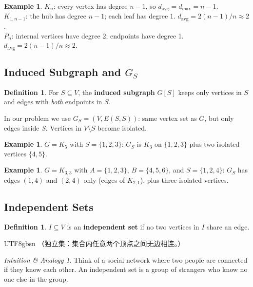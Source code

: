 \documentclass[12pt]{article}
\theoremstyle{definition}
\newtheorem{definition}[theorem]{Definition}
\newtheorem{example}[theorem]{Example}
\theoremstyle{remark}
\newtheorem{intuition}[theorem]{Intuition \& Analogy}
\begin{document}
\begin{example}
$K_n$: every vertex has degree $n-1$, so $d_{\mathrm{avg}} = d_{\max} = n-1$.\\
$K_{1,n-1}$: the hub has degree $n-1$; each leaf has degree $1$.
$d_{\mathrm{avg}} = 2(n-1)/n \approx 2$.\\
$P_n$: internal vertices have degree 2; endpoints have degree 1.
$d_{\mathrm{avg}} = 2(n-1)/n \approx 2$.
\end{example}

\subsection{Induced Subgraph and \texorpdfstring{$G_S$}{GS}}

\begin{definition}
For $S \subseteq V$, the \textbf{induced subgraph} $G[S]$ keeps only vertices in $S$
and edges with \emph{both} endpoints in $S$.

In our problem we use $G_S = (V, E(S,S))$: same vertex set as $G$,
but only edges inside $S$.  Vertices in $V \setminus S$ become isolated.
\end{definition}

\begin{example}
$G = K_5$ with $S = \{1,2,3\}$: $G_S$ is $K_3$ on $\{1,2,3\}$ plus two isolated vertices $\{4,5\}$.
\end{example}

\begin{example}
$G = K_{3,3}$ with $A = \{1,2,3\}$, $B = \{4,5,6\}$, and $S = \{1,2,4\}$:
$G_S$ has edges $(1,4)$ and $(2,4)$ only (edges of $K_{2,1}$), plus three isolated vertices.
\end{example}

\subsection{Independent Sets}

\begin{definition}
$I \subseteq V$ is an \textbf{independent set} if no two vertices in $I$ share an edge.
\end{definition}

\begin{CJK}{UTF8}{gbsn}
（独立集：集合内任意两个顶点之间无边相连。）
\end{CJK}

\begin{intuition}
Think of a social network where two people are connected if they know each other.
An independent set is a group of strangers who know no one else in the group.
\end{intuition}
\end{document}
